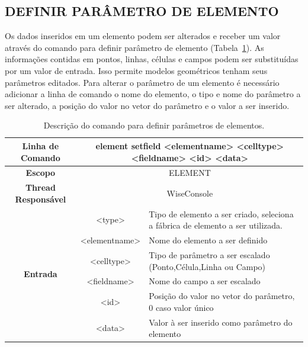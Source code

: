 \subsection{DEFINIR PARÂMETRO DE ELEMENTO}\label{sec:set_field_element}

Os dados inseridos em um elemento podem ser alterados e receber um valor através do comando para definir parâmetro de elemento (Tabela~\ref{tab:set_field_element}). As informações contidas em pontos, linhas, células e campos podem ser substituídas por um valor de entrada. Isso permite modelos geométricos tenham seus parâmetros editados. Para alterar o parâmetro de um elemento é necessário adicionar a linha de comando o nome do elemento, o tipo e nome do parâmetro a ser alterado, a posição do valor no vetor do parâmetro e o valor a ser inserido.

\begin{center}
	\begin{table}[!htbp]
		\begin{tabularx}{\textwidth}{c|c|X}
			\toprule
			\textbf{Linha de Comando} & \multicolumn{2}{X}{element set\underline{\space\space}field <element\underline{\space\space}name> <cell\underline{\space\space}type> <field\underline{\space\space}name> <id> <data>} \\
			\midrule
			\textbf{Escopo} & \multicolumn{2}{c}{ELEMENT} \\
			\hline
			\textbf{Thread Responsável} & \multicolumn{2}{c}{WiseConsole} \\
			\hline
			\multirow{6}{*}{\textbf{Entrada}} & <type> & Tipo de elemento a ser criado, seleciona a fábrica de elemento a ser utilizada. \\
			
			& <element\underline{\space\space}name> & Nome do elemento a ser definido \\
			& <cell\underline{\space\space}type> & Tipo de parâmetro a ser escalado (Ponto,Célula,Linha ou Campo) \\
			& <field\underline{\space\space}name> & Nome do campo a ser escalado \\
			& <id> & Posição do valor no vetor do parâmetro, 0 caso valor único \\
			& <data> & Valor à ser inserido como parâmetro do elemento \\
			\bottomrule
		\end{tabularx}
		\caption{Descrição do comando para definir parâmetros de elementos.}
		\label{tab:set_field_element}
	\end{table}
\end{center}

